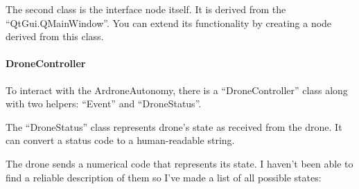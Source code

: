 \documentclass[12pt]{article}
\begin{document}
    The second class is the interface node itself.
    It is derived from the ``QtGui.QMainWindow''. You can extend
    its functionality by creating a node derived from this class.


    \paragraph{DroneController} To interact with the ArdroneAutonomy,
    there is a ``DroneController'' class along with two helpers: ``Event''
    and ``DroneStatus''.

    The ``DroneStatus'' class represents drone's state
    as received from the drone.
    It can convert a status code to a human-readable string.

    The drone sends a numerical code that represents its state.
    I haven't been able to find a reliable description of them so I've
    made a list of all possible states:
\end{document}

